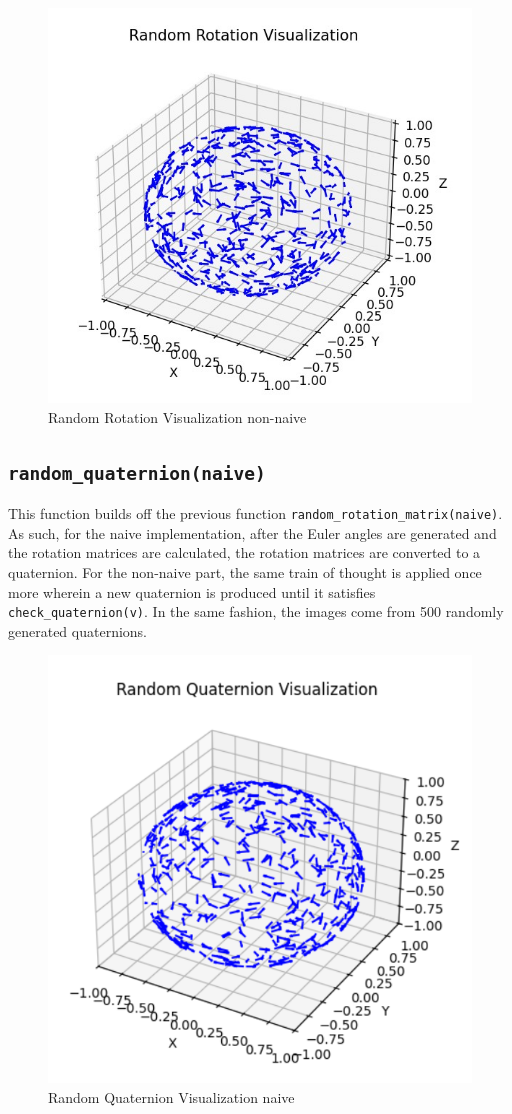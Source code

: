 \documentclass{article}
\begin{document}
\begin{figure} [H]
    \centering
    \includegraphics[width=0.5\linewidth]{latex_media/Random Rotation Visualization non-naive.jpg}
    \caption{Random Rotation Visualization non-naive}
    \label{fig:2}
\end{figure}


\subsection{\texttt{random\_quaternion(naive)}}

This function builds off the previous function \texttt{random\_rotation\_matrix(naive)}. As such, for the naive implementation, after the Euler angles are generated and the rotation matrices are calculated, the rotation matrices are converted to a quaternion. For the non-naive part, the same train of thought is applied once more wherein a new quaternion is produced until it satisfies \texttt{check\_quaternion(v)}. In the same fashion, the images come from 500 randomly generated quaternions.

\begin{figure} [H]
    \centering
    \includegraphics[width=0.5\linewidth]{latex_media/component_2_random_q_naive.png}
    \caption{Random Quaternion Visualization naive}
\end{figure}
\end{document}
